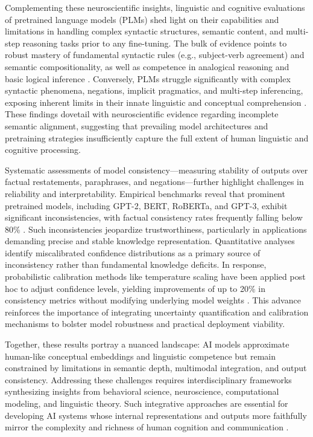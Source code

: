 Complementing these neuroscientific insights, linguistic and cognitive evaluations of pretrained language models (PLMs) shed light on their capabilities and limitations in handling complex syntactic structures, semantic content, and multi-step reasoning tasks prior to any fine-tuning. The bulk of evidence points to robust mastery of fundamental syntactic rules (e.g., subject-verb agreement) and semantic compositionality, as well as competence in analogical reasoning and basic logical inference \cite{ref34}. Conversely, PLMs struggle significantly with complex syntactic phenomena, negations, implicit pragmatics, and multi-step inferencing, exposing inherent limits in their innate linguistic and conceptual comprehension \cite{ref34}. These findings dovetail with neuroscientific evidence regarding incomplete semantic alignment, suggesting that prevailing model architectures and pretraining strategies insufficiently capture the full extent of human linguistic and cognitive processing.

Systematic assessments of model consistency—measuring stability of outputs over factual restatements, paraphrases, and negations—further highlight challenges in reliability and interpretability. Empirical benchmarks reveal that prominent pretrained models, including GPT-2, BERT, RoBERTa, and GPT-3, exhibit significant inconsistencies, with factual consistency rates frequently falling below 80\% \cite{ref35}. Such inconsistencies jeopardize trustworthiness, particularly in applications demanding precise and stable knowledge representation. Quantitative analyses identify miscalibrated confidence distributions as a primary source of inconsistency rather than fundamental knowledge deficits. In response, probabilistic calibration methods like temperature scaling have been applied post hoc to adjust confidence levels, yielding improvements of up to 20\% in consistency metrics without modifying underlying model weights \cite{ref35}. This advance reinforces the importance of integrating uncertainty quantification and calibration mechanisms to bolster model robustness and practical deployment viability.

Together, these results portray a nuanced landscape: AI models approximate human-like conceptual embeddings and linguistic competence but remain constrained by limitations in semantic depth, multimodal integration, and output consistency. Addressing these challenges requires interdisciplinary frameworks synthesizing insights from behavioral science, neuroscience, computational modeling, and linguistic theory. Such integrative approaches are essential for developing AI systems whose internal representations and outputs more faithfully mirror the complexity and richness of human cognition and communication \cite{ref2,ref4,ref5,ref34,ref35}.

